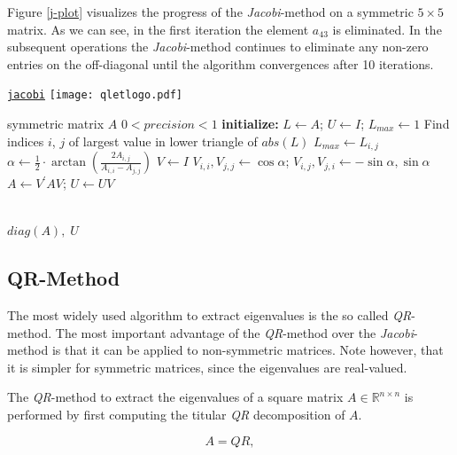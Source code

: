 \documentclass[12pt]{article}
\begin{document}
Figure \ref{j-plot} visualizes the progress of the \textit{Jacobi}-method on a symmetric $5 \times 5$ matrix. As we can see, in the first iteration the element $a_43$ is eliminated. In the subsequent operations the \textit{Jacobi}-method continues to eliminate any non-zero entries on the off-diagonal until the algorithm convergences after 10 iterations.

\begin{algorithm}
\caption{\href {https://github.com/thsis/NIS18/blob/master/algorithms/eigen.py}{\texttt{jacobi}}  \protect\texttt{[image: qletlogo.pdf]}}

\label{j-algo}
\begin{algorithmic}[1]
  \Require symmetric matrix $A$
  \Ensure $0 < precision < 1$
  \Statex \textbf{initialize: } $L \gets A$; $U \gets I$; $L_{max} \gets 1$
    \State Find indices $i$, $j$ of largest value in lower triangle of $abs(L)$
        \State $L_{max} \gets L_{i,j}$
            \State $\alpha \gets \frac{1}{2}\cdot \arctan(\frac{2A_{i, j}}{A_{i, i}-A_{j, j}})$
    \State $V \gets I$
    \State $V_{i, i}, V_{j, j} \gets \cos \alpha$; $V_{i, j}, V_{j, i} \gets -\sin \alpha, \sin \alpha$
    \State $A \gets V^{\prime} A V$; $U \gets UV$

  \EndWhile\\
  \Return $diag(A),\; U$
\end{algorithmic}
\end{algorithm}

\subsection{QR-Method}

The most widely used algorithm to extract eigenvalues is the so called \textit{QR}-method. The most important advantage of the \textit{QR}-method over the \textit{Jacobi}-method is that it can be applied to non-symmetric matrices. Note however, that it is simpler for symmetric matrices, since the eigenvalues are real-valued.

The \textit{QR}-method to extract the eigenvalues of a square matrix $A \in \mathbb{R}^{n \times n}$ is performed by first computing the titular \textit{QR} decomposition of $A$.

\begin{equation}
\label{qr_a}
A = QR,
\end{equation}
\end{document}
